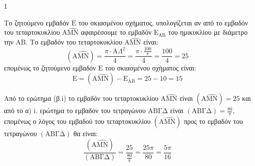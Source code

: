 \begin{ylh}{1}
    \item [Ύλη από εικόνα]
\end{ylh}
\begin{alist}
    \item[\textalpha)]
    \item[\textbeta)]
    \begin{rlist}
        \item Το ζητούμενο εμβαδόν $$ του σκιασμένου σχήματος, υπολογίζεται αν από το εμβαδόν του τεταρτοκυκλίου $$ αφαιρέσουμε το εμβαδόν $_{}$ του ημικυκλίου με διάμετρο την $$.
        Το εμβαδόν του τεταρτοκυκλίου $$ είναι:
        \[ (\text{A}\widehat{\text{MN}}) = \frac{\pi \cdot \text{A}\Lambda^2}{4} = \frac{\pi \cdot \frac{100}{\pi}}{4} = \frac{100}{4} = 25 \]
        επομένως το ζητούμενο εμβαδόν $$ του σκιασμένου σχήματος είναι:
        \[ \text{E} = (\text{A}\widehat{\text{MN}}) - \text{E}_{\text{AB}} = 25 - 10 = 15 \]

        \item Από το ερώτημα (β.i) το εμβαδόν του τεταρτοκυκλίου $$ είναι $() = 25$ και από το α) i. ερώτημα το εμβαδόν του τετραγώνου $$ είναι $() = $, επομένως ο λόγος του εμβαδού του τεταρτοκυκλίου $()$ προς το εμβαδόν του τετραγώνου $()$ θα είναι:
        \[ \frac{(\text{A}\widehat{\text{MN}})}{(\text{ΑΒΓΔ})} = \frac{25}{\frac{80}{\pi}} = \frac{25\pi}{80} = \frac{5\pi}{16} \]
    \end{rlist}
\end{alist}